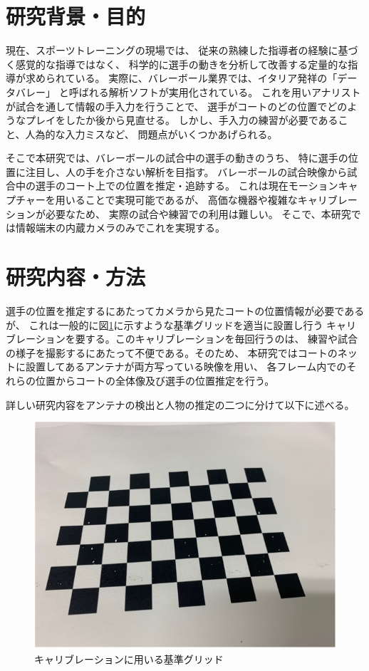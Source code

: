 \documentclass[twoside,twocolumn]{jsarticle}
\begin{document}
\maketitle
\section{研究背景・目的}
	現在、スポーツトレーニングの現場では、
	従来の熟練した指導者の経験に基づく感覚的な指導ではなく、
	科学的に選手の動きを分析して改善する定量的な指導が求められている。
	実際に、バレーボール業界では、イタリア発祥の「データバレー」
	と呼ばれる解析ソフトが実用化されている。
	これを用いアナリストが試合を通して情報の手入力を行うことで、
	選手がコートのどの位置でどのようなプレイをしたか後から見直せる。
	しかし、手入力の練習が必要であること、人為的な入力ミスなど、
	問題点がいくつかあげられる。

	そこで本研究では、バレーボールの試合中の選手の動きのうち、
	特に選手の位置に注目し、人の手を介さない解析を目指す。
	バレーボールの試合映像から試合中の選手のコート上での位置を推定・追跡する。 
	これは現在モーションキャプチャーを用いることで実現可能であるが、
	高価な機器や複雑なキャリブレーションが必要なため、
	実際の試合や練習での利用は難しい。
	そこで、本研究では情報端末の内蔵カメラのみでこれを実現する。 
\section{研究内容・方法}
	選手の位置を推定するにあたってカメラから見たコートの位置情報が必要であるが、
	これは一般的に図\ref{fig:calibration}に示すような基準グリッドを適当に設置し行う
	キャリブレーションを要する。このキャリブレーションを毎回行うのは、
	練習や試合の様子を撮影するにあたって不便である。そのため、
	本研究ではコートのネットに設置してあるアンテナが両方写っている映像を用い、
	各フレーム内でのそれらの位置からコートの全体像及び選手の位置推定を行う。 

	詳しい研究内容をアンテナの検出と人物の推定の二つに分けて以下に述べる。 

	\begin{figure}[h]
		\centering
		\includegraphics[width=0.8\hsize]{calibration.jpg}
		\caption{キャリブレーションに用いる基準グリッド}
		\label{fig:calibration}
	\end{figure}
\end{document}
